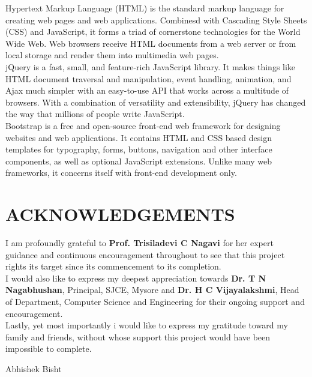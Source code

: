 \documentclass[12pt,a4paper]{article}
\begin{document}
Hypertext Markup Language (HTML) is the standard markup language for creating web pages and web applications.
Combinesd with Cascading Style Sheets (CSS) and JavaScript, it forms a triad of cornerstone technologies for the World Wide Web. Web browsers receive HTML documents from a web server or from local storage and render them into multimedia web pages.\\

jQuery is a fast, small, and feature-rich JavaScript library. It makes things like HTML document traversal and manipulation, event handling, animation, and Ajax much simpler with an easy-to-use API that works across a multitude of browsers. With a combination of versatility and extensibility, jQuery has changed the way that millions of people write JavaScript.\cite{javascript}\\

Bootstrap is a free and open-source front-end web framework for designing websites and web applications. It contains HTML and CSS based design templates for typography, forms, buttons, navigation and other interface components, as well as optional JavaScript extensions. Unlike many web frameworks, it concerns itself with front-end development only.\cite{bootstrap}



\newpage
\section*{\huge ACKNOWLEDGEMENTS}

I am profoundly grateful to \textbf{Prof. Trisiladevi C Nagavi} for her expert guidance
and continuous encouragement throughout to see that this project rights its
target since its commencement to its completion.\\

I would also like to express my deepest appreciation towards \textbf{Dr. T N Nagabhushan},
Principal, SJCE, Mysore and \textbf{Dr. H C Vijayalakshmi}, 
Head of Department, Computer Science and Engineering for their ongoing support and encouragement.\\

Lastly, yet most importantly i would like to express my gratitude toward my family and friends, without whose support this project would have been impossible to complete.

\begin{flushright}
{
Abhishek Bisht
}
\end{flushright}
\end{document}
